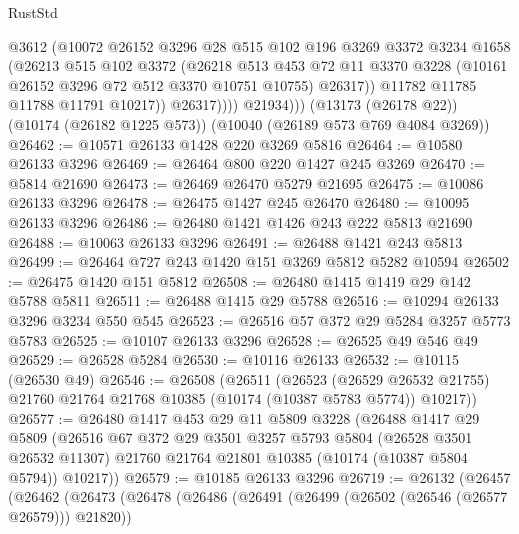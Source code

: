 \begin{lexlean}{RustStd}
\begin{coremodule}
                    @3612
                    (@10072
                      @26152
                      @3296
                      @28
                      @515
                      @102
                      @196
                      @3269
                      @3372
                      @3234
                      @1658
                      (@26213
                        @515
                        @102
                        @3372
                        (@26218
                          @513
                          @453
                          @72
                          @11
                          @3370
                          @3228
                          (@10161 @26152 @3296 @72 @512 @3370 @10751 @10755)
                          @26317))
                      @11782
                      @11785
                      @11788
                      @11791
                      @10217))
                  @26317))))
          @21934)))
    (@13173 (@26178 @22))
    (@10174 (@26182 @1225 @573))
    (@10040 (@26189 @573 @769 @4084 @3269))
@26462 := @10571 @26133 @1428 @220 @3269 @5816
@26464 := @10580 @26133 @3296
@26469 := @26464 @800 @220 @1427 @245 @3269
@26470 := @5814 @21690
@26473 := @26469 @26470 @5279 @21695
@26475 := @10086 @26133 @3296
@26478 := @26475 @1427 @245 @26470
@26480 := @10095 @26133 @3296
@26486 := @26480 @1421 @1426 @243 @222 @5813 @21690
@26488 := @10063 @26133 @3296
@26491 := @26488 @1421 @243 @5813
@26499 := @26464 @727 @243 @1420 @151 @3269 @5812 @5282 @10594
@26502 := @26475 @1420 @151 @5812
@26508 := @26480 @1415 @1419 @29 @142 @5788 @5811
@26511 := @26488 @1415 @29 @5788
@26516 := @10294 @26133 @3296 @3234 @550 @545
@26523 := @26516 @57 @372 @29 @5284 @3257 @5773 @5783
@26525 := @10107 @26133 @3296
@26528 := @26525 @49 @546 @49
@26529 := @26528 @5284
@26530 := @10116 @26133
@26532 := @10115 (@26530 @49)
@26546 := @26508
    (@26511
      (@26523
        (@26529 @26532 @21755)
        @21760
        @21764
        @21768
        @10385
        (@10174 (@10387 @5783 @5774))
        @10217))
@26577 := @26480
    @1417
    @453
    @29
    @11
    @5809
    @3228
    (@26488
      @1417
      @29
      @5809
      (@26516
        @67
        @372
        @29
        @3501
        @3257
        @5793
        @5804
        (@26528 @3501 @26532 @11307)
        @21760
        @21764
        @21801
        @10385
        (@10174 (@10387 @5804 @5794))
        @10217))
@26579 := @10185 @26133 @3296
@26719 := @26132
    (@26457
      (@26462
        (@26473
          (@26478
            (@26486
              (@26491 (@26499 (@26502 (@26546 (@26577 @26579))) @21820))

\end{coremodule}
\end{lexlean}
